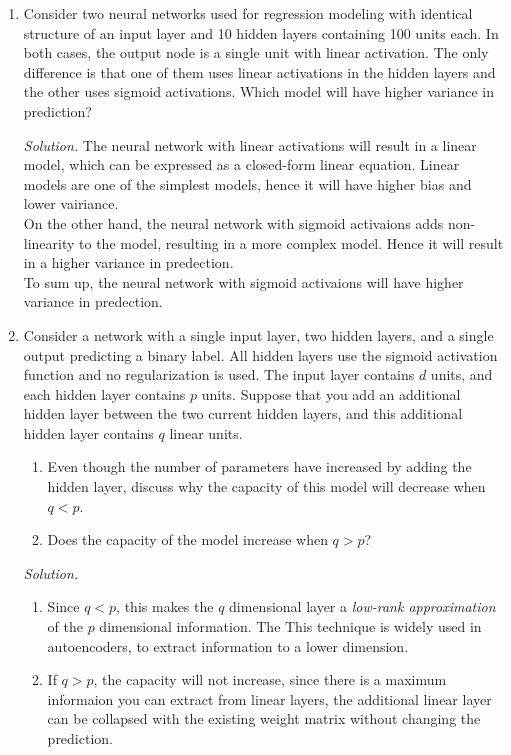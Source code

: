 \documentclass[12pt]{article}
\newcommand\sol[1] {
    \begin{mdframed}
        \emph{Solution.} #1
    \end{mdframed}
}
\begin{document}
\begin{enumerate}[ref=\theenumi]
{        }
    \item Consider two neural networks used for regression modeling with 
        identical structure of an input layer and 10 hidden layers containing 
        100 units each. In both cases, the output node is a single unit with 
        linear activation. The only difference is that one of them uses linear 
        activations in the hidden layers and the other uses sigmoid activations.
        Which model will have higher variance in prediction?
        \sol{
            The neural network with linear activations will result in a linear
            model, which can be expressed as a closed-form linear equation.
            Linear models are one of the simplest models, hence it will have higher
            bias and lower vairiance. \\ 
            On the other hand, the neural network with sigmoid activaions adds
            non-linearity to the model, resulting in a more complex model. Hence
            it will result in a higher variance in predection. \\ 
            To sum up, the neural network with sigmoid activaions will have
            higher variance in predection.
        }
    \item Consider a network with a single input layer, two hidden layers, and 
        a single output predicting a binary label. All hidden layers use the 
        sigmoid activation function and no regularization is used. The input 
        layer contains $d$ units, and each hidden layer contains $p$ units. Suppose 
        that you add an additional hidden layer between the two current hidden 
        layers, and this additional hidden layer contains $q$ linear units.
        \begin{enumerate}
            \item Even though the number of parameters have increased by adding 
                the hidden layer, discuss why the capacity of this model will 
                decrease when $q < p$.
            \item Does the capacity of the model increase when $q > p$?
        \end{enumerate}
        \sol{
            \begin{enumerate}
                \item Since $q < p$, this makes the $q$ dimensional layer a 
                    \emph{low-rank approximation} of the $p$ dimensional information.
                    The This technique is widely used in autoencoders, 
                    to extract information to a lower dimension.
                \item If $q > p$, the capacity will not increase, since there
                    is a maximum informaion you can extract from linear layers, 
                    the additional linear layer can be collapsed with the existing 
                    weight matrix without changing the prediction.
            \end{enumerate}


        }
\end{enumerate}
\end{document}
